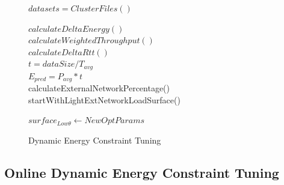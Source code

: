 \documentclass[conference]{IEEEtran}
\makeatletter
\newcommand{\removelatexerror}{\let\@latex@error\@gobble}
\makeatother
\begin{document}
%

\begin{figure}[!t]
\removelatexerror%
\begin{algorithm}[H]
\caption{Dynamic Energy Constraint Tuning}
  $datasets = ClusterFiles()$ \\
   {
     $calculateDeltaEnergy()$        \\
     $calculateWeightedThroughput()$ \\
     $calculateDeltaRtt()$    \\
     $t = dataSize / T_{avg}$    \\
     $E_{pred} = P_{avg} * t$      \\
     calculateExternalNetworkPercentage()\\
     startWithLightExtNetworkLoadSurface()\\
      {
    }
          
    {
        $surface_{Low\theta} \leftarrow NewOptParams$
    }
}%
\end{algorithm}
\end{figure}


\subsection{Online Dynamic Energy Constraint Tuning }
\end{document}

